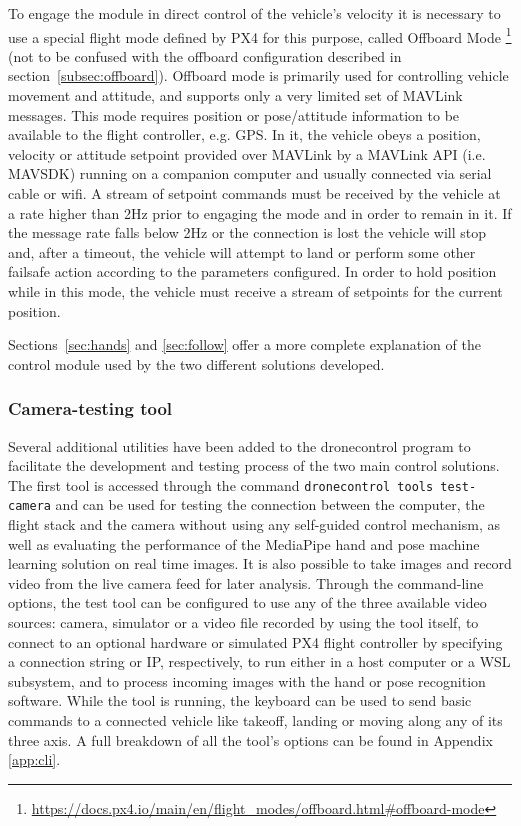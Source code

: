 To engage the module in direct control of the vehicle's velocity it is necessary to use a special flight mode defined by PX4 for this purpose, called Offboard Mode \footnote{\url{https://docs.px4.io/main/en/flight_modes/offboard.html\#offboard-mode}} (not to be confused with the offboard configuration described in section~\ref{subsec:offboard}).
Offboard mode is primarily used for controlling vehicle movement and attitude, and supports only a very limited set of MAVLink messages. This mode requires position or pose/attitude information to be available to the flight controller, e.g. GPS.
In it, the vehicle obeys a position, velocity or attitude setpoint provided over MAVLink by a MAVLink API (i.e. MAVSDK) running on a companion computer and usually connected via serial cable or wifi.
A stream of setpoint commands must be received by the vehicle at a rate higher than 2Hz prior to engaging the mode and in order to remain in it.
If the message rate falls below 2Hz or the connection is lost the vehicle will stop and, after a timeout, the vehicle will attempt to land or perform some other failsafe action according to the parameters configured.
In order to hold position while in this mode, the vehicle must receive a stream of setpoints for the current position.

Sections~\ref{sec:hands} and \ref{sec:follow} offer a more complete explanation of the control module used by the two different solutions developed.

\subsubsection{Camera-testing tool}
\label{subsec:test-tools}

Several additional utilities have been added to the dronecontrol program to facilitate the development and testing process of the two main control solutions.
The first tool is accessed through the command \texttt{dronecontrol tools test-camera} and can be used for testing the connection between the computer, the flight stack and the camera without using any self-guided control mechanism, as well as evaluating the performance of the MediaPipe hand and pose machine learning solution on real time images.
It is also possible to take images and record video from the live camera feed for later analysis.
Through the command-line options, the test tool can be configured to use any of the three available video sources: camera, simulator or a video file recorded by using the tool itself,
to connect to an optional hardware or simulated PX4 flight controller by specifying a connection string or IP, respectively,
to run either in a host computer or a WSL subsystem,
and to process incoming images with the hand or pose recognition software.
While the tool is running, the keyboard can be used to send basic commands to a connected vehicle like takeoff, landing or moving along any of its three axis.
A full breakdown of all the tool's options can be found in Appendix \ref{app:cli}.




